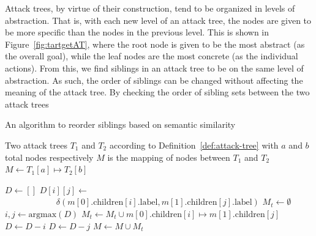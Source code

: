 Attack trees, by virtue of their construction, tend to be organized in levels of abstraction. That is, with each new level of an attack tree, the nodes are given to be more specific than the nodes in the previous level. This is shown in Figure~\ref{fig:tartgetAT}, where the root node is given to be the most abstract (as the overall goal), while the leaf nodes are the most concrete (as the individual actions). From this, we find siblings in an attack tree to be on the same level of abstraction. As such, the order of siblings can be changed without affecting the meaning of the attack tree. By checking the order of sibling sets between the two attack trees



\begin{algorithm}
    \caption{An algorithm to reorder siblings based on semantic similarity}
    \label{alg:sibling_reorder}
    \begin{algorithmic}
        \State Two attack trees $T_1$ and $T_2$ according to Definition~\ref{def:attack-tree} with $a$ and $b$ total nodes respectively
        \State $M$ is the mapping of nodes between $T_1$ and $T_2$ 
        \State $M \gets T_1[a]\mapsto T_2[b]$

        \State $D \gets []$ 
        \State $D[i][j] \gets$
        \State$\text{  }\text{  }\text{  }\text{  }\text{  }\text{  }\text{  }\text{  }\text{  }\delta(m[0].\text{children}[i].\text{label}, m[1].\text{children}[j].\text{label})$
        \EndFor
        \EndFor
        \State $M_t \gets \emptyset$ 
        \State $i, j \gets \text{argmax}(D)$ 
        \State $M_t \gets M_t \cup m[0].\text{children}[i]\mapsto m[1].\text{children}[j]$
        \State $D \gets D - i$ 
        \State $D \gets D - j$ 
        \EndWhile
        \EndIf
        \EndFor
        \State $M \gets M \cup M_t$
        \EndFor
    \end{algorithmic}
\end{algorithm}



